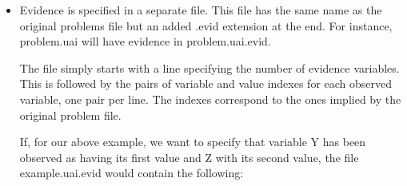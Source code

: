 \documentclass[letterpaper,10pt,openany,oneside,english]{sphinxmanual}
\begin{document}
\begin{sphinxVerbatim}[commandchars=\\\{\}]
  
 
  
  

  

  
  

   
   
\end{sphinxVerbatim}
\begin{itemize}
\item {} 
\sphinxAtStartPar
{}

\sphinxAtStartPar
Evidence is specified in a separate file. This file has the same name as the original problems file but an added .evid extension at the end. For instance, problem.uai will have evidence in problem.uai.evid.

\sphinxAtStartPar
The file simply starts with a line specifying the number of evidence variables. This is followed by the pairs of variable and value indexes for each observed variable, one pair per line. The indexes correspond to the ones implied by the original problem file.

\sphinxAtStartPar
If, for our above example, we want to specify that variable Y has been observed as having its first value and Z with its second value, the file example.uai.evid would contain the following:

\begin{sphinxVerbatim}[commandchars=\\\{\}]
  
  
\end{sphinxVerbatim}

\end{itemize}

\sphinxstepscope
\end{document}

